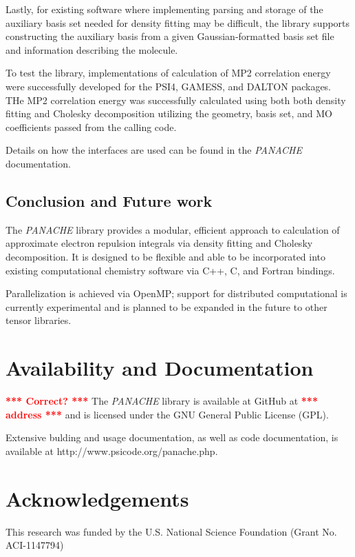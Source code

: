 \documentclass[12pt,letterpaper]{article}
\newcommand{\panache}{\textit{PANACHE}\xspace}
\newcommand{\edit}[1]{\textbf{\textcolor{red}{*** #1 ***}}\xspace}
\begin{document}
Lastly, for existing software where implementing parsing and storage of
the auxiliary basis set needed for density fitting may be difficult,
the library supports constructing the auxiliary basis from a given
Gaussian-formatted basis set file and information describing the molecule.

To test the library, implementations of calculation of MP2 correlation
energy\cite{Werner:2003a} were successfully developed for the
PSI4\cite{Turney:2012a}, GAMESS\cite{Gamessbook, Schmidt:1993a}, and
DALTON\cite{DaltonLink, Dalton} packages. THe MP2 correlation energy was
successfully calculated using both both density fitting and Cholesky
decomposition utilizing the geometry, basis set, and MO coefficients
passed from the calling code.

Details on how the interfaces are used can be found in the \panache
documentation.


\subsection{Conclusion and Future work}
\label{sec:plans}

The \panache library provides a modular, efficient approach to calculation
of approximate electron repulsion integrals via density fitting and
Cholesky decomposition.  It is designed to be flexible and able to be
incorporated into existing computational chemistry software via C++, C,
and Fortran bindings.

Parallelization is achieved via OpenMP; support for distributed
computational is currently experimental and is planned to be expanded
in the future to other tensor libraries.


\section{Availability and Documentation}
\label{sec:availability}

\edit{Correct?}
The \panache library is available at GitHub at \edit{address} and is licensed under
the GNU General Public License (GPL).

Extensive bulding and usage documentation, as well as code documentation,
is available at http://www.psicode.org/panache.php.


\section{Acknowledgements}
\label{sec:ack}
This research was funded by the U.S. National Science Foundation (Grant No. ACI-1147794)


%

\end{document}
